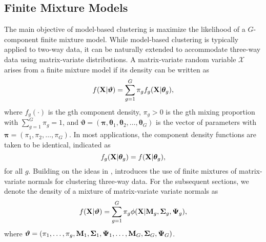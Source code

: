 \documentclass[12pt]{report}
\begin{document}
\subsection{Finite Mixture Models}
The main objective of model-based clustering is maximize the likelihood of a $G$-component finite mixture model. While model-based clustering is typically applied to two-way data, it can be naturally extended to accommodate three-way data using matrix-variate distributions. A matrix-variate random variable $\mathscr{X}$ arises from a finite mixture model if its density can be written as
\begin{equation*}
f({\bf X} | \bm{\vartheta}) = \sum_{g=1}^G \pi_g f_g({\bf X} | \bm{\theta}_g),
\end{equation*}
where $f_g(\cdot)$ is the gth component density, $\pi_g >0$ is the gth mixing proportion with $\sum_{g=1}^G\pi_g = 1$, and $\bm{\vartheta} = (\bm{\pi}, \bm{\theta}_1, \bm{\theta}_2, \dots, \bm{\theta}_G)$ is the vector of parameters with $\bm{\pi} = (\pi_1, \pi_2, \dots, \pi_G)$. In most applications, the component density functions are taken to be identical, indicated as $$f_g({\bf X} | \bm{\theta}_g) = f({\bf X} | \bm{\theta}_g),$$ for all $g$. Building on the ideas in \citet{wolfe1965}, \citet{viroli2011} introduces the use of finite mixtures of matrix-variate normals for clustering three-way data. For the subsequent sections, we denote the density of a mixture of matrix-variate variate normals as
\begin{equation*}f({\bf X} | \bm{\vartheta}) = \sum_{g=1}^G \pi_g \phi({\bf X} | {\bf M}_g, {\bf \Sigma}_g, {\bf \Psi}_g),\end{equation*}
where $\bm{\vartheta} = (\pi_1, \dots, \pi_g, {\bf M}_1, {\bf \Sigma}_1, {\bf \Psi}_1, \dots, {\bf M}_G, {\bf \Sigma}_G, {\bf \Psi}_G)$.




\end{document}
